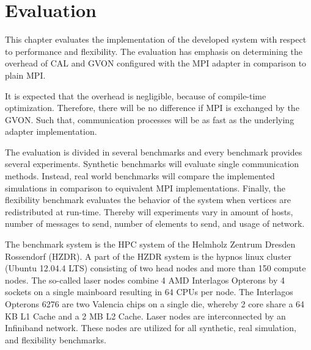 \chapter{Evaluation}
\label{sec:evaluation}


This chapter evaluates the implementation of the developed
system with respect to performance and flexibility.  The
evaluation has emphasis on determining the overhead of CAL and GVON
configured with the MPI adapter in comparison to plain MPI.

It is expected that the overhead is negligible, because of
compile-time optimization. Therefore, there will be no difference if
MPI is exchanged by the GVON. Such that, communication processes will
be as fast as the underlying adapter implementation.

The evaluation is divided in several benchmarks and every benchmark
provides several experiments. Synthetic benchmarks will evaluate
single communication methods. Instead, real world benchmarks
will compare the implemented simulations in comparison to equivalent
MPI implementations. Finally, the flexibility benchmark evaluates the
behavior of the system when vertices are redistributed at run-time.
Thereby will experiments vary in amount of hosts, number of messages
to send, number of elements to send, and usage of network.

The benchmark system is the HPC system of the Helmholz
Zentrum Dresden Rossendorf (HZDR)\cite{ref:hzdr_cluster}.
A part of the HZDR system is the hypnos linux cluster (Ubuntu 12.04.4
LTS) consisting of two head nodes and more than 150 compute nodes.
The so-called laser nodes combine 4 AMD Interlagos Opterons by 4
sockets on a single mainboard resulting in 64 CPUs per node.  The
Interlagos Opterons 6276 are two Valencia chips on a single die,
whereby 2 core share a 64 KB L1 Cache and a 2 MB L2 Cache. Laser nodes
are interconnected by an Infiniband network. These nodes are utilized
for all synthetic, real simulation, and flexibility benchmarks.

